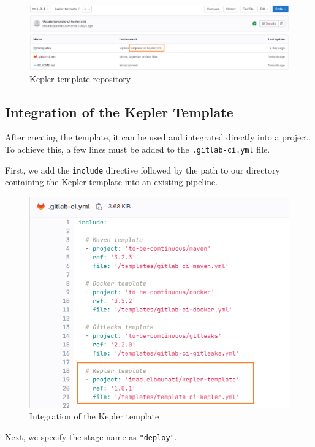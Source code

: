 \begin{figure}[H]
    \centering
    \includegraphics[width=19cm]{Figures/kepler-template-gitlab.png}
    \caption{Kepler template repository}
\end{figure}

\subsection{Integration of the Kepler Template}

After creating the template, it can be used and integrated directly into a project. To achieve this, a few lines must be added to the \texttt{.gitlab-ci.yml} file.

First, we add the \texttt{include} directive followed by the path to our directory containing the Kepler template into an existing pipeline.

\begin{figure}[H]
  \centering
  \includegraphics[width=13cm]{Figures/kepler-template-integration.png}
  \caption{Integration of the Kepler template}
\end{figure}

Next, we specify the stage name as \texttt{"deploy"}.

